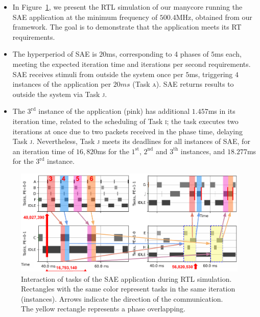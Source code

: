 \begin{frame}
	\begin{itemize}
		\item In Figure~\ref{fig:phases}, we present the RTL simulation of our manycore running the SAE application at the minimum frequency of $500.4$MHz, obtained from our framework. The goal is to demonstrate that the application meets its RT requirements. 
		
		\item The hyperperiod of SAE is $20$ms, corresponding to 4 phases of $5$ms each, meeting the expected iteration time and iterations per second requirements. SAE receives stimuli from outside the system once per $5$ms, triggering $4$ instances of the application per $20ms$ (Task \textsc{a}). SAE returns results to outside the system via Task \textsc{j}. 
		
		\item The $3^{\text{rd}}$ instance of the application (pink) has additional $1.457$ms in its iteration time, related to the scheduling of Task \textsc{i}; the task executes two iterations at once due to two packets received in the phase time, delaying Task \textsc{j}. Nevertheless, Task \textsc{j} meets its deadlines for all instances of SAE, for an iteration time of $16,820$ms for the $1^{\text{st}}$, $2^{\text{nd}}$ and $3^{\text{th}}$ instances, and $18.277$ms for the $3^{\text{rd}}$ instance.
	\end{itemize}
\end{frame}


\begin{frame}
	\begin{figure}[!ht]
		\centerline{\includegraphics[width=0.8\columnwidth]{fig/results.pdf}}
		\caption{Interaction of tasks of the SAE application during RTL simulation. Rectangles with the same color represent tasks in the same iteration (instances). Arrows indicate the direction of the communication. The yellow rectangle represents a phase overlapping.}
		\vspace{-16 pt}
		\label{fig:phases}
	\end{figure}
\end{frame}
